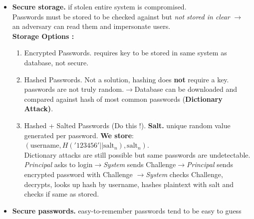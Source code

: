 \documentclass[9pt, a4paper]{extarticle}
\let\oldwarning\warning
\renewcommand{\warning}{\raisebox{0.3ex}{\oldwarning}}
\begin{document}
\begin{minipage}[t]{0.495\textwidth}
\begin{itemize}[leftmargin=10px]
		\item[III] \textbf{Secure storage.} if stolen entire system is compromised.\\
		      Passwords must be stored to be checked against but \textit{not stored in clear} $\rightarrow$ an adversary can read them and impersonate users.\\
		      \textbf{
			      Storage Options :}
		      \begin{enumerate}[leftmargin=10px]
			      \item Encrypted Passwords. requires key to be stored in same system as database, not secure.
			      \item Hashed Passwords. Not a solution, hashing does \textbf{not} require a key. \warning passwords are not truly random.$\rightarrow$Database can be downloaded and compared against hash of most common passwords (\textbf{Dictionary Attack)}.
			      \item Hashed + Salted Passwords (Do this !). \textbf{Salt.} unique random value generated per password. \textbf{We store}: $(\text{username}, H('123456'||\text{salt}_n), \text{salt}_n)$. \\ Dictionary attacks are still possible but same passwords are undetectable.\\
			            \textit{Principal} asks to login$\rightarrow$\textit{System} sends Challenge$\rightarrow$\textit{Principal} sends encrypted password with Challenge $\rightarrow$\textit{System} checks Challenge, decrypts, looks up hash by username, hashes plaintext with salt and checks if same as stored.
		      \end{enumerate}

		\item[IV] \textbf{Secure passwords.} easy-to-remember passwords tend to be easy to guess
	\end{itemize}


\end{minipage}
\end{document}
